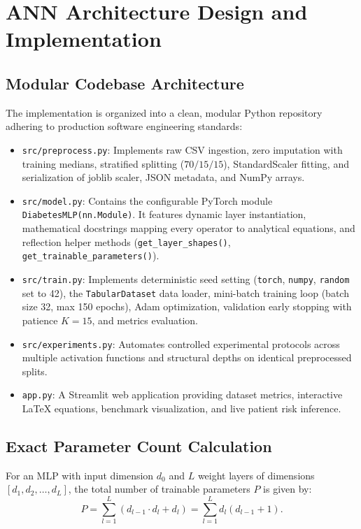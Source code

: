 \documentclass[11pt,a4paper]{article}
\begin{document}
\section{ANN Architecture Design and Implementation}
\label{sec:architecture_design}

\subsection{Modular Codebase Architecture}
The implementation is organized into a clean, modular Python repository adhering to production software engineering standards:
\begin{itemize}[leftmargin=*]
    \item \texttt{src/preprocess.py}: Implements raw CSV ingestion, zero imputation with training medians, stratified splitting ($70/15/15$), StandardScaler fitting, and serialization of joblib scaler, JSON metadata, and NumPy arrays.
    \item \texttt{src/model.py}: Contains the configurable PyTorch module \texttt{DiabetesMLP(nn.Module)}. It features dynamic layer instantiation, mathematical docstrings mapping every operator to analytical equations, and reflection helper methods (\texttt{get\_layer\_shapes()}, \texttt{get\_trainable\_parameters()}).
    \item \texttt{src/train.py}: Implements deterministic seed setting (\texttt{torch}, \texttt{numpy}, \texttt{random} set to 42), the \texttt{TabularDataset} data loader, mini-batch training loop (batch size 32, max 150 epochs), Adam optimization, validation early stopping with patience $K=15$, and metrics evaluation.
    \item \texttt{src/experiments.py}: Automates controlled experimental protocols across multiple activation functions and structural depths on identical preprocessed splits.
    \item \texttt{app.py}: A Streamlit web application providing dataset metrics, interactive LaTeX equations, benchmark visualization, and live patient risk inference.
\end{itemize}

\subsection{Exact Parameter Count Calculation}
For an MLP with input dimension $d_0$ and $L$ weight layers of dimensions $[d_1, d_2, \dots, d_L]$, the total number of trainable parameters $P$ is given by:
\begin{equation}
    P = \sum_{l=1}^L \left( d_{l-1} \cdot d_l + d_l \right) = \sum_{l=1}^L d_l(d_{l-1} + 1).
\end{equation}
\end{document}
